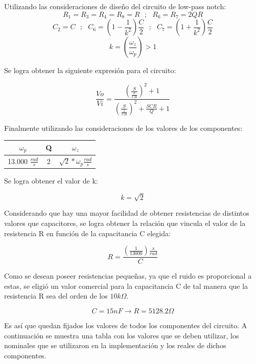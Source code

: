 Utilizando las consideraciones de diseño del circuito de low-pass notch:
$$R_1=R_3=R_4=R_8=R \ \ \ ; \ \ \ R_6=R_7=2QR$$
$$C_2=C \ \ \ ; \ \ \ C_6=(1-\frac{1}{k^2})\frac{C}{2}  \ \ \ ; \ \ \ C_7=(1+\frac{1}{k^2})\frac{C}{2}$$
$$k=\left(\frac{\omega_z}{\omega_p} \right) > 1$$

Se logra obtener la siguiente expresión para el circuito:

\begin{equation}
\frac{Vo}{Vi} = \frac{\left(\frac{S}{\frac{k}{C R}}\right)^2 + 1}{\left( \frac{S}{\frac{1}{CR}} \right)^2+\frac{SCR}{Q} + 1}
\label{circ_trans_simple}
\end{equation}

Finalmente utilizando las consideraciones de los valores de los componentes:
\begin{table}[H]
\centering
\begin{tabular}{@{}ccc@{}}
\toprule
$\omega_p$ & Q & $\omega_z$ \\ \midrule
13.000 $\frac{rad}{s}$ & 2 & $\sqrt{2}*\omega_p \frac{rad}{s}$ \\ \bottomrule
\end{tabular}
\end{table}
Se logra obtener el valor de k:

\begin{equation}
k = \sqrt{2}
\end{equation}

Considerando que hay una mayor facilidad de obtener resistencias de distintos valores que capacitores, se logra obtener la relación que vincula el valor de la resistencia R en función de la capacitancia C elegida:

\begin{equation}
R = \frac{\left(\frac{1}{13000}\right) \frac{s}{rad}}{C}
\end{equation}

Como se desean poseer resistencias pequeñas, ya que el ruido es proporcional a estas, se eligió un valor comercial para la capacitancia C de tal manera que la resistencia R sea del orden de los $10k\Omega$.

$$C=15nF \rightarrow R=5128.2\Omega$$

Es así que quedan fijados los valores de todos los componentes del circuito. A continuación se muestra una tabla con los valores que se deben utilizar, los nominales que se utilizaron en la implementación y los reales de dichos componentes.

